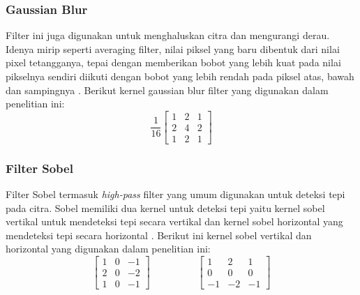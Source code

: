 \subsubsection{Gaussian Blur}
Filter ini juga digunakan untuk menghaluskan citra dan mengurangi derau. Idenya mirip seperti averaging filter, nilai piksel yang baru dibentuk dari nilai pixel tetangganya, tepai dengan memberikan bobot yang lebih kuat pada nilai pikselnya sendiri diikuti dengan bobot yang lebih rendah pada piksel atas, bawah dan sampingnya . Berikut kernel gaussian blur filter yang digunakan dalam penelitian ini:
\begin{equation*}
    \label{kernel:mean2}
    \frac{1}{16}
    \left[
    \begin{matrix}
        1 & 2 & 1 \\
        2 & 4 & 2 \\
        1 & 2 & 1
    \end{matrix}
    \right]
\end{equation*}

\subsubsection{Filter Sobel}
Filter Sobel termasuk \textit{high-pass} filter yang umum digunakan untuk deteksi tepi pada citra. Sobel memiliki dua kernel untuk deteksi tepi yaitu kernel sobel vertikal untuk mendeteksi tepi secara vertikal dan kernel sobel horizontal yang mendeteksi tepi secara horizontal . Berikut ini kernel sobel vertikal dan horizontal yang digunakan dalam penelitian ini:
\begin{equation*}
    \label{kernel:sobel-h}
    \left[
    \begin{matrix}
        1 & 0 & -1 \\
        2 & 0 & -2 \\
        1 & 0 & -1
    \end{matrix}
    \right]
    \hspace{2cm}
    \left[
        \begin{matrix}
        1 & 2 & 1 \\
        0 & 0 & 0 \\
        -1 & -2 & -1
    \end{matrix}
    \right]
\end{equation*}

